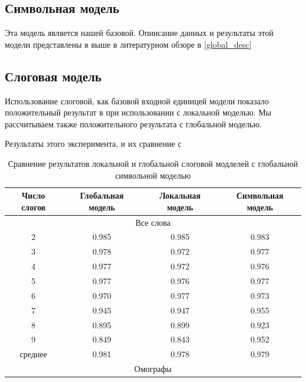 \documentclass[14pt, a4paper, russian]{report}
\begin{document}
\begin{normalsize}
\subsection{Символьная модель}
Эта модель является нашей базовой. Опиисание данных и результаты этой модели представлены в выше в литературном обзоре в \cref{global_desc}

\subsection{Слоговая модель}
Использование слоговой, как базовой входной единицей модели показало положительный результат в при использовании с локальной моделью. Мы рассчитываем также положительного результата с глобальной моделью.

Результаты этого эксперимента, и их сравнение с  

\begin{table}[H]
	\caption{Сравнение результатов локальной и глобальной слоговой модлелей с глобальной символьной моделью}
	
	\begin{small}
		\begin{center}
			\begin{tabular}{|c | c | c|c|}
				\hline
				Число слогов & Глобальная модель & Локальная модель & Символьная модель \\ \hline
				\multicolumn{4}{|c|}{Все слова}                                       \\ \hline
				2       & 0.985  &      0.985      & 0.983             \\ \hline
				3       &   0.978 &      0.972      & 0.977             \\ \hline
				4       &   0.977 &      0.972      & 0.976             \\ \hline
				5       &  0.977 &      0.976      & 0.977             \\ \hline
				6       &  0.970 &      0.977      & 0.973             \\ \hline
				7       &  0.945 &      0.947      & 0.955             \\ \hline
				8       &  0.895 &      0.899      & 0.923             \\ \hline
				9       & 0.849 &      0.843      & 0.952             \\ \hline
				среднее    & 0.981 &      0.978      & 0.979             \\ \hline
				\multicolumn{4}{|c|}{Омографы}                                        \\ \hline
				

\end{tabular}
\end{center}
\end{small}
\end{table}
\end{normalsize}
\end{document}
